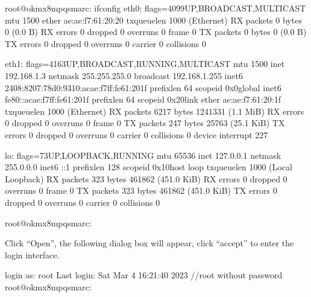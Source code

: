 \documentclass[letterpaper,10pt,openany,english]{sphinxmanual}
\begin{document}
\begin{sphinxVerbatim}[commandchars=\\\{\}]
root@ok\PYGZhy{}mx8mpq\PYGZhy{}smarc:\PYGZti{}\PYGZsh{} ifconfig
eth0: flags=4099\PYGZlt{}UP,BROADCAST,MULTICAST\PYGZgt{}  mtu 1500
        ether ae:ae:f7:61:20:20  txqueuelen 1000  (Ethernet)
        RX packets 0  bytes 0 (0.0 B)
        RX errors 0  dropped 0  overruns 0  frame 0
        TX packets 0  bytes 0 (0.0 B)
        TX errors 0  dropped 0 overruns 0  carrier 0  collisions 0

eth1: flags=4163\PYGZlt{}UP,BROADCAST,RUNNING,MULTICAST\PYGZgt{}  mtu 1500
        inet 192.168.1.3  netmask 255.255.255.0  broadcast 192.168.1.255
        inet6 2408:8207:78d0:9310:acae:f7ff:fe61:201f  prefixlen 64  scopeid 0x0\PYGZlt{}global\PYGZgt{}
        inet6 fe80::acae:f7ff:fe61:201f  prefixlen 64  scopeid 0x20\PYGZlt{}link\PYGZgt{}
        ether ae:ae:f7:61:20:1f  txqueuelen 1000  (Ethernet)
        RX packets 6217  bytes 1241331 (1.1 MiB)
        RX errors 0  dropped 0  overruns 0  frame 0
        TX packets 247  bytes 25763 (25.1 KiB)
        TX errors 0  dropped 0 overruns 0  carrier 0  collisions 0
        device interrupt 227

lo: flags=73\PYGZlt{}UP,LOOPBACK,RUNNING\PYGZgt{}  mtu 65536
        inet 127.0.0.1  netmask 255.0.0.0
        inet6 ::1  prefixlen 128  scopeid 0x10\PYGZlt{}host\PYGZgt{}
        loop  txqueuelen 1000  (Local Loopback)
        RX packets 323  bytes 461862 (451.0 KiB)
        RX errors 0  dropped 0  overruns 0  frame 0
        TX packets 323  bytes 461862 (451.0 KiB)
        TX errors 0  dropped 0 overruns 0  carrier 0  collisions 0

root@ok\PYGZhy{}mx8mpq\PYGZhy{}smarc:\PYGZti{}\PYGZsh{}
\end{sphinxVerbatim}

\sphinxAtStartPar
{}

\sphinxAtStartPar
Click “Open”, the following dialog box will appear, click “accept” to enter the login interface.

\sphinxAtStartPar
{}

\begin{sphinxVerbatim}[commandchars=\\\{\}]
login as: root
Last login: Sat Mar  4 16:21:40 2023  //root without password
root@ok\PYGZhy{}mx8mpq\PYGZhy{}smarc:\PYGZti{}\PYGZsh{}
\end{sphinxVerbatim}
\end{document}
